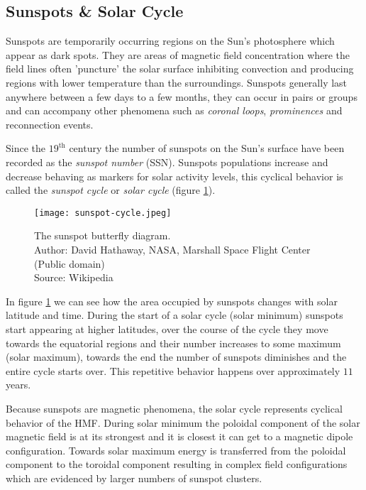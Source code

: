 \subsection{Sunspots \& Solar Cycle}\label{sec:sunspots}

Sunspots are temporarily occurring regions on the Sun's photosphere which appear as dark spots. They are areas 
of magnetic field concentration where the field lines often 'puncture' the solar surface inhibiting convection 
and producing regions with lower temperature than the surroundings. Sunspots generally last anywhere between a 
few days to a few months, they can occur in pairs or groups and can accompany other phenomena such as 
\emph{coronal loops}, \emph{prominences} and reconnection events.

Since the $19^{\text{th}}$ century the number of sunspots on the Sun's surface have been recorded as the 
\emph{sunspot number} (SSN). Sunspots populations increase and decrease behaving as markers for solar activity levels, 
this cyclical behavior is called the \emph{sunspot cycle} or \emph{solar cycle} (figure \ref{fig:SolarCycle}). 

\begin{figure}
    \noindent\texttt{[image: sunspot-cycle.jpeg]}
    \caption{{\small The sunspot butterfly diagram.  \\ 
    Author: David Hathaway, NASA, Marshall Space Flight Center (Public domain) \\ 
    Source: Wikipedia}}
    \label{fig:SolarCycle}
\end{figure}

In figure \ref{fig:SolarCycle} we can see how the area occupied by sunspots changes with solar latitude and time. 
During the start of a solar cycle (solar minimum) sunspots start appearing at higher latitudes, over the course 
of the cycle they move towards the equatorial regions and their number increases to some maximum (solar maximum), 
towards the end the number of sunspots diminishes and the entire cycle starts over. This repetitive behavior 
happens over approximately $11$ years.

Because sunspots are magnetic phenomena, the solar cycle represents cyclical behavior of the HMF. During solar 
minimum the poloidal component of the solar magnetic field is at its strongest and it is closest it can get to 
a magnetic dipole configuration. Towards solar maximum energy is transferred from the poloidal component to the 
toroidal component resulting in complex field configurations which are evidenced by larger numbers of sunspot 
clusters.

